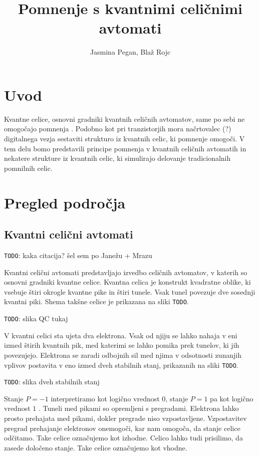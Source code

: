 \documentclass[a4paper, 11pt]{article}
\title{Pomnenje s kvantnimi celičnimi avtomati}
\author{Jasmina Pegan, Blaž Rojc}
\newcommand{\todo}{\textcolor{BrickRed}{\texttt{TODO}}} %
\begin{document}
\maketitle

\section{Uvod}

Kvantne celice, osnovni gradniki kvantnih celičnih avtomatov, same po sebi ne omogočajo pomnenja \cite{janez_phd}.
Podobno kot pri tranzistorjih mora načrtovalec (?) digitalnega vezja sestaviti strukturo iz kvantnih celic, ki pomnenje omogoči.
V tem delu bomo predstavili principe pomnenja v kvantnih celičnih avtomatih in nekatere strukture iz kvantnih celic, ki simulirajo delovanje tradicionalnih pomnilnih celic.



\section{Pregled področja}

\subsection{Kvantni celični avtomati}

\todo: kaka citacija? šel sem po Janežu + Mrazu

Kvantni celični avtomati predstavljajo izvedbo celičnih avtomatov, v katerih so osnovni gradniki kvantne celice.
Kvantna celica je konstrukt kvadratne oblike, ki vsebuje štiri okrogle kvantne pike in štiri tunele.
Vsak tunel povezuje dve sosednji kvantni piki.
Shema takšne celice je prikazana na sliki \todo.

\todo: slika QC tukaj

V kvantni celici sta ujeta dva elektrona.
Vsak od njiju se lahko nahaja v eni izmed štirih kvantnih pik, med katerimi se lahko pomika prek tunelov, ki jih povezujejo.
Elektrona se zaradi odbojnih sil med njima v odsotnosti zunanjih vplivov postavita v eno izmed dveh stabilnih stanj, prikazanih na sliki \todo.

\todo: slika dveh stabilnih stanj

Stanje $P = -1$ interpretiramo kot logično vrednost $0$, stanje $P = 1$ pa kot logično vrednost $1$ \cite{lent_1993}.
Tuneli med pikami so opremljeni s pregradami.
Elektrona lahko prosto prehajata med pikami, dokler pregrade niso vzpostavljene.
Vzpostavitev pregrad prehajanje elektronov onemogoči, kar nam omogoča, da stanje celice odčitamo.
Take celice označujemo kot izhodne.
Celico lahko tudi prisilimo, da zasede določeno stanje.
Take celice označujemo kot vhodne.
\end{document}
